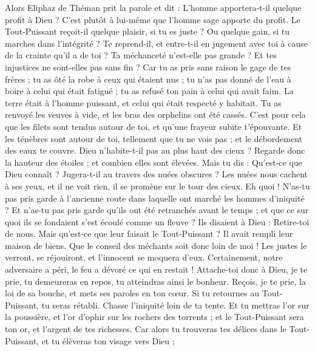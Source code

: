 \begin{multicols}{2}
\VerseOne{}Alors Eliphaz de Théman prit la parole et dit : 
L'homme apportera-t-il quelque profit à Dieu ? C'est plutôt à lui-même que l'homme sage apporte du profit. 
Le Tout-Puissant reçoit-il quelque plaisir, si tu es juste ? Ou quelque gain, si tu marches dans l'intégrité ?
Te reprend-il, et entre-t-il en jugement avec toi à cause de la crainte qu'il a de toi ? 
Ta méchanceté n'est-elle pas grande ? Et tes injustices ne sont-elles pas sans fin ? 
Car tu as pris sans raison le gage de tes frères ; tu as ôté la robe à ceux qui étaient nus ;
tu n'as pas donné de l'eau à boire à celui qui était fatigué ; tu as refusé ton pain à celui qui avait faim.
La terre était à l'homme puissant, et celui qui était respecté y habitait. 
Tu as renvoyé les veuves à vide, et les bras des orphelins ont été cassés.
C'est pour cela que les filets sont tendus autour de toi, et qu'une frayeur subite t'épouvante. 
Et les ténèbres sont autour de toi, tellement que tu ne vois pas ; et le débordement des eaux te couvre.
Dieu n'habite-t-il pas au plus haut des cieux ? Regarde donc la hauteur des étoiles ; et combien elles sont élevées.
Mais tu dis : Qu'est-ce que Dieu connaît ? Jugera-t-il au travers des nuées obscures ? 
Les nuées nous cachent à ses yeux, et il ne voit rien, il se promène sur le tour des cieux. 
Eh quoi ! N'as-tu pas pris garde à l'ancienne route dans laquelle ont marché les hommes d'iniquité ?
Et n'as-tu pas pris garde qu'ils ont été retranchés avant le temps ; et que ce sur quoi ils se fondaient s'est écoulé comme un fleuve ?
Ils disaient à Dieu : Retire-toi de nous. Mais qu'est-ce que leur faisait le Tout-Puissant ?
Il avait rempli leur maison de biens. Que le conseil des méchants soit donc loin de moi !
Les justes le verront, se réjouiront, et l'innocent se moquera d'eux.
Certainement, notre adversaire a péri, le feu a dévoré ce qui en restait !
Attache-toi donc à Dieu, je te prie, tu demeureras en repos, tu atteindras ainsi le bonheur.
Reçois, je te prie, la loi de sa bouche, et mets ses paroles en ton cœur.
Si tu retournes au Tout-Puissant, tu seras rétabli. Chasse l'iniquité loin de ta tente.
Et tu mettras l'or sur la poussière, et l'or d'ophir sur les rochers des torrents ;
et le Tout-Puissant sera ton or, et l'argent de tes richesses.
Car alors tu trouveras tes délices dans le Tout-Puissant, et tu élèveras ton visage vers Dieu ; 

\end{multicols}
